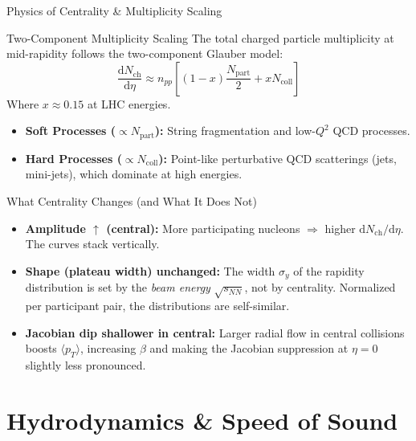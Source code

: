 \documentclass[aspectratio=169]{beamer}
\begin{document}
\begin{frame}[shrink=4]{Physics of Centrality \& Multiplicity Scaling}
    \begin{block}{Two-Component Multiplicity Scaling}
        \small
        The total charged particle multiplicity at mid-rapidity follows the two-component Glauber model:
        \[ \frac{\mathrm{d}N_{\mathrm{ch}}}{\mathrm{d}\eta} \approx n_{pp} \left[ (1 - x) \frac{N_{\mathrm{part}}}{2} + x N_{\mathrm{coll}} \right] \]
        Where $x \approx 0.15$ at LHC energies.
        \begin{itemize}
            \item \textbf{Soft Processes ($\propto N_{\mathrm{part}}$):} String fragmentation and low-$Q^2$ QCD processes.
            \item \textbf{Hard Processes ($\propto N_{\mathrm{coll}}$):} Point-like perturbative QCD scatterings (jets, mini-jets), which dominate at high energies.
        \end{itemize}
    \end{block}
    \begin{block}{What Centrality Changes (and What It Does Not)}
        \footnotesize
        \begin{itemize}
            \item \textbf{Amplitude $\uparrow$ (central):} More participating nucleons $\Rightarrow$ higher $\mathrm{d}N_\mathrm{ch}/\mathrm{d}\eta$. The curves stack vertically.
            \item \textbf{Shape (plateau width) unchanged:} The width $\sigma_y$ of the rapidity distribution is set by the \textit{beam energy} $\sqrt{s_{NN}}$, not by centrality. Normalized per participant pair, the distributions are self-similar.
            \item \textbf{Jacobian dip shallower in central:} Larger radial flow in central collisions boosts $\langle p_T \rangle$, increasing $\beta$ and making the Jacobian suppression at $\eta = 0$ slightly less pronounced.
        \end{itemize}
    \end{block}
\end{frame}

\section{Hydrodynamics \& Speed of Sound}
\end{document}
